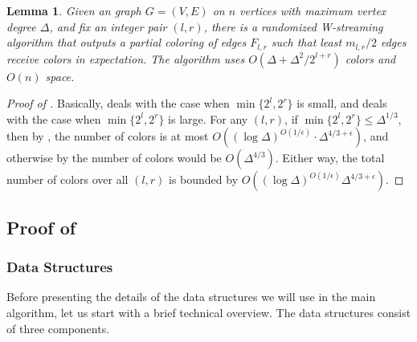 \documentclass[11pt,a4paper]{article}
\newtheorem{lemma}{Lemma}[section]
\newcommand{\brac}[1]{\left(#1\right)}
\begin{document}
\begin{lemma}\label{high}
	Given an graph $G = (V, E)$ on $n$ vertices with maximum vertex degree $\Delta$, and fix an integer pair $(l, r)$, there is a randomized W-streaming algorithm that outputs a partial coloring of edges $F_{l, r}$ such that least $m_{l, r}/2$ edges receive colors in expectation. The algorithm uses $O\brac{\Delta + \Delta^2 / 2^{l+r}}$ colors and $O(n)$ space.
	
\end{lemma}

\begin{proof}[Proof of ]
	Basically,  deals with the case when $\min\{2^l, 2^r\}$ is small, and  deals with the case when $\min\{2^l, 2^r\}$ is large. For any $(l, r)$, if $\min\{2^l, 2^r\}\leq \Delta^{1/3}$, then by , the number of colors is at most $O\brac{(\log\Delta)^{O(1 / \epsilon)}\cdot \Delta^{4/3+\epsilon}}$, and otherwise by  the number of colors would be $O\brac{\Delta^{4/3}}$. Either way, the total number of colors over all $(l, r)$ is bounded by $O\brac{(\log\Delta)^{O(1/\epsilon)}\Delta^{4/3+\epsilon}}$.
\end{proof}

\subsection{Proof of }
\subsubsection{Data Structures}\label{Btree}

Before presenting the details of the data structures we will use in the main algorithm, let us start with a brief technical overview. The data structures consist of three components.
\end{document}
